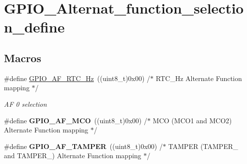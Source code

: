 \hypertarget{group___g_p_i_o___alternat__function__selection__define}{}\section{G\+P\+I\+O\+\_\+\+Alternat\+\_\+function\+\_\+selection\+\_\+define}
\label{group___g_p_i_o___alternat__function__selection__define}
\subsection*{Macros}
\begin{DoxyCompactItemize}
\item 
\mbox{\label{group___g_p_i_o___alternat__function__selection__define_ga93071f0121fab9f8f13e59c612ed6291}} 
\#define \mbox{\hyperlink{group___g_p_i_o___alternat__function__selection__define_ga93071f0121fab9f8f13e59c612ed6291}{G\+P\+I\+O\+\_\+\+A\+F\+\_\+\+R\+T\+C\+\_\+Hz}}~((uint8\+\_\+t)0x00)  /$\ast$ R\+T\+C\+\_\+Hz Alternate Function mapping $\ast$/
\begin{DoxyCompactList}\small\item\em AF 0 selection ~\newline
 \end{DoxyCompactList}\item 
\mbox{\label{group___g_p_i_o___alternat__function__selection__define_gacfe2ce01055b82d0fcdd93da513f7cc0}} 
\#define {\bfseries G\+P\+I\+O\+\_\+\+A\+F\+\_\+\+M\+CO}~((uint8\+\_\+t)0x00)  /$\ast$ M\+C\+O (\+M\+C\+O1 and M\+C\+O2) Alternate Function mapping $\ast$/
\item 
\mbox{\label{group___g_p_i_o___alternat__function__selection__define_gac284edf4c3267d864b3d56cc6bf6ac95}} 
\#define {\bfseries G\+P\+I\+O\+\_\+\+A\+F\+\_\+\+T\+A\+M\+P\+ER}~((uint8\+\_\+t)0x00)  /$\ast$ T\+A\+M\+P\+E\+R (\+T\+A\+M\+P\+E\+R\+\_ and T\+A\+M\+P\+E\+R\+\_) Alternate Function mapping $\ast$/
\item 
\mbox{\label{group___g_p_i_o___alternat__function__selection__define_ga63cfa7c46dc0c5ab9cdf7340cc95f7fc}} 

\end{DoxyCompactItemize}
